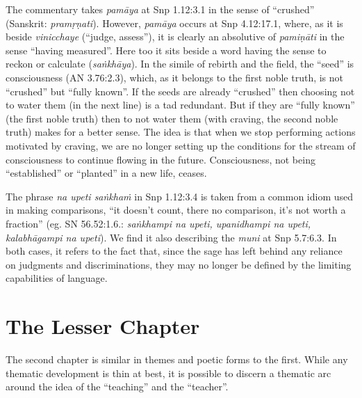 \documentclass[12pt,openany]{book}%
\begin{document}
The commentary takes \textit{\textsanskrit{pamāya}} at Snp 1.12:3.1 in the sense of “crushed” (Sanskrit: \textit{\textsanskrit{pramṛṇati}}). However, \textit{\textsanskrit{pamāya}} occurs at Snp 4.12:17.1, where, as it is beside \textit{vinicchaye} (“judge, assess”), it is clearly an absolutive of \textit{\textsanskrit{pamiṇāti}} in the sense “having measured”. Here too it sits beside a word having the sense to reckon or calculate (\textit{\textsanskrit{saṅkhāya}}). In the simile of rebirth and the field, the “seed” is consciousness (AN 3.76:2.3), which, as it belongs to the first noble truth, is not “crushed” but “fully known”. If the seeds are already “crushed” then choosing not to water them (in the next line) is a tad redundant. But if they are “fully known” (the first noble truth) then to not water them (with craving, the second noble truth) makes for a better sense. The idea is that when we stop performing actions motivated by craving, we are no longer setting up the conditions for the stream of consciousness to continue flowing in the future. Consciousness, not being “established” or “planted” in a new life, ceases.

The phrase \textit{na upeti \textsanskrit{saṅkhaṁ}} in Snp 1.12:3.4 is taken from a common idiom used in making comparisons, “it doesn’t count, there no comparison, it’s not worth a fraction” (eg. SN 56.52:1.6.: \textit{\textsanskrit{saṅkhampi} na upeti, upanidhampi na upeti, \textsanskrit{kalabhāgampi} na upeti}). We find it also describing the \textit{muni} at Snp 5.7:6.3. In both cases, it refers to the fact that, since the sage has left behind any reliance on judgments and discriminations, they may no longer be defined by the limiting capabilities of language.

\section*{The Lesser Chapter}

The second chapter is similar in themes and poetic forms to the first. While any thematic development is thin at best, it is possible to discern a thematic arc around the idea of the “teaching” and the “teacher”.
\end{document}
